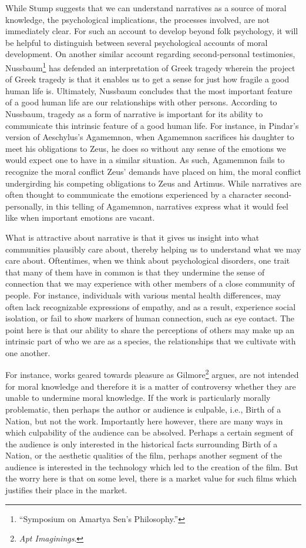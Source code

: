 \documentclass[phdthesis,12pt,final,a4paper]{wuthesis}
\theoremstyle{definition}
\theoremstyle{definition}
\theoremstyle{definition}
\theoremstyle{definition}
\theoremstyle{remark}
\begin{document}
While Stump suggests that we can understand narratives as a source of moral knowledge, the psychological implications, the processes involved, are not immediately clear. For such an account to develop beyond folk psychology, it will be helpful to distinguish between several psychological accounts of moral development. On another similar account regarding second-personal testimonies, Nussbaum\footnote{{``Symposium on {Amartya Sen}'s Philosophy.''}} has defended an interpretation of Greek tragedy wherein the project of Greek tragedy is that it enables us to get a sense for just how fragile a good human life is. Ultimately, Nussbaum concludes that the most important feature of a good human life are our relationships with other persons. According to Nussbaum, tragedy as a form of narrative is important for its ability to communicate this intrinsic feature of a good human life. For instance, in Pindar's version of Aeschylus's Agamemnon, when Agamemnon sacrifices his daughter to meet his obligations to Zeus, he does so without any sense of the emotions we would expect one to have in a similar situation. As such, Agamemnon fails to recognize the moral conflict Zeus' demands have placed on him, the moral conflict undergirding his competing obligations to Zeus and Artimus. While narratives are often thought to communicate the emotions experienced by a character second-personally, in this telling of Agamemnon, narratives express what it would feel like when important emotions are vacant.

What is attractive about narrative is that it gives us insight into what communities plausibly care about, thereby helping us to understand what we may care about. Oftentimes, when we think about psychological disorders, one trait that many of them have in common is that they undermine the sense of connection that we may experience with other members of a close community of people. For instance, individuals with various mental health differences, may often lack recognizable expressions of empathy, and as a result, experience social isolation, or fail to show markers of human connection, such as eye contact. The point here is that our ability to share the perceptions of others may make up an intrinsic part of who we are as a species, the relationships that we cultivate with one another.

For instance, works geared towards pleasure as Gilmore\footnote{\emph{Apt {Imaginings}}.} argues, are not intended for moral knowledge and therefore it is a matter of controversy whether they are unable to undermine moral knowledge. If the work is particularly morally problematic, then perhaps the author or audience is culpable, i.e., Birth of a Nation, but not the work. Importantly here however, there are many ways in which culpability of the audience can be absolved. Perhaps a certain segment of the audience is only interested in the historical facts surrounding Birth of a Nation, or the aesthetic qualities of the film, perhaps another segment of the audience is interested in the technology which led to the creation of the film. But the worry here is that on some level, there is a market value for such films which justifies their place in the market.
\end{document}
